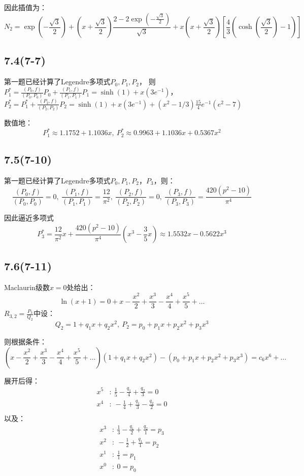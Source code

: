 \documentclass[UTF8,zihao=5]{ctexart}
\begin{document}
因此插值为：
$$
    N_2=\exp(-\frac{\sqrt{3}}{2}) + (x+\frac{\sqrt{3}}{2})\frac{2-2\exp(-\frac{\sqrt{3}}{2})}{\sqrt{3}}
    +x(x+\frac{\sqrt{3}}{2})\left[\frac{4}{3}(\cosh(\frac{\sqrt{3}}{2})-1)\right]
$$

\subsection*{7.4(7-7)}

第一题已经计算了Legendre多项式$P_0,P_1,P_2$，
则$P_1^*=\frac{(P_0,f)}{(P_0,P_0)}P_0+\frac{(P_1,f)}{(P_1,P_1)}P_1=\sinh(1)+x(3e^{-1})$，
$P_2^*=P_1^*+\frac{(P_2,f)}{(P_2,P_2)}P_2=\sinh(1)+x(3e^{-1})+(x^2-1/3)\frac{15}{4}e^{-1}(e^2-7)$

数值地：
$$
    P_1^*\approx 1.1752+1.1036x,\ P_2^*\approx 0.9963+1.1036x+0.5367x^2
$$

\subsection*{7.5(7-10)}
第一题已经计算了Legendre多项式$P_0,P_1,P_2，P_3$，则：
$$
    \frac{(P_0,f)}{(P_0,P_0)}=0,\
    \frac{(P_1,f)}{(P_1,P_1)}=\frac{12}{\pi^2},\
    \frac{(P_2,f)}{(P_2,P_2)}=0,\
    \frac{(P_3,f)}{(P_3,P_3)}=\frac{420(p^2-10)}{\pi^4}
$$

因此逼近多项式
$$
    P_3^*=\frac{12}{\pi^2}x+\frac{420(p^2-10)}{\pi^4}(x^3-\frac{3}{5}x)
    \approx 1.5532x -0.5622x^3
$$

\subsection*{7.6(7-11)}

Maclaurin级数$x=0$处给出：
$$
    \ln(x+1)=0+x-\frac{x^2}{2}+\frac{x^3}{3}-\frac{x^4}{4}+\frac{x^5}{5}+\dots
$$
$R_{3,2}=\frac{P_3}{Q_2}$中设：
$$
    Q_2=1+q_1x+q_2x^2,\ P_2=p_0+p_1x+p_2x^2+p_3x^3
$$

则根据条件：
$$
    (x-\frac{x^2}{2}+\frac{x^3}{3}-\frac{x^4}{4}+\frac{x^5}{5}+\dots)(1+q_1x+q_2x^2)
    -
    (p_0+p_1x+p_2x^2+p_3x^3)=c_{6}x^6+\dots
$$

展开后得：
$$
    \begin{aligned}
        x^5 & :\ \frac{1}{5}-\frac{q_1}{4}+\frac{q_2}{3}=0  \\
        x^4 & :\ -\frac{1}{4}+\frac{q_1}{3}-\frac{q_2}{2}=0 \\
    \end{aligned}
$$
以及：
$$
    \begin{aligned}
        x^3 & :\ \frac{1}{3}-\frac{q_1}{2}+\frac{q_2}{1}=p_3 \\
        x^2 & :\ -\frac{1}{2}+\frac{q_1}{1}=p_2              \\
        x^1 & :\ \frac{1}{1}=p_1                             \\
        x^0 & :\ 0=p_0                                       \\
    \end{aligned}
$$
\end{document}
